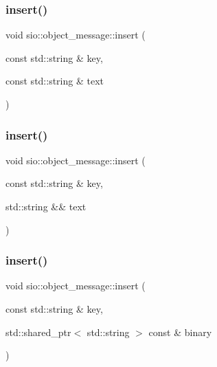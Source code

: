 \mbox{\label{classsio_1_1object__message_a1d00380eb3c8bef206aeeaffc2a9d1e0}} 
\subsubsection{\texorpdfstring{insert()}{insert()}\hspace{0.1cm}{\footnotesize\ttfamily [2/5]}}
{\footnotesize\ttfamily void sio\+::object\+\_\+message\+::insert (\begin{DoxyParamCaption}\item[{const std\+::string \&}]{key,  }\item[{const std\+::string \&}]{text }\end{DoxyParamCaption})\hspace{0.3cm}{\ttfamily [inline]}}

\mbox{\label{classsio_1_1object__message_a3932caf1b59398c1a7bf07720614f0b0}} 
\subsubsection{\texorpdfstring{insert()}{insert()}\hspace{0.1cm}{\footnotesize\ttfamily [3/5]}}
{\footnotesize\ttfamily void sio\+::object\+\_\+message\+::insert (\begin{DoxyParamCaption}\item[{const std\+::string \&}]{key,  }\item[{std\+::string \&\&}]{text }\end{DoxyParamCaption})\hspace{0.3cm}{\ttfamily [inline]}}

\mbox{\label{classsio_1_1object__message_a8070cf3c80b9f02cb66e0e767666b30f}} 
\subsubsection{\texorpdfstring{insert()}{insert()}\hspace{0.1cm}{\footnotesize\ttfamily [4/5]}}
{\footnotesize\ttfamily void sio\+::object\+\_\+message\+::insert (\begin{DoxyParamCaption}\item[{const std\+::string \&}]{key,  }\item[{std\+::shared\+\_\+ptr$<$ std\+::string $>$ const \&}]{binary }\end{DoxyParamCaption})\hspace{0.3cm}{\ttfamily [inline]}}


